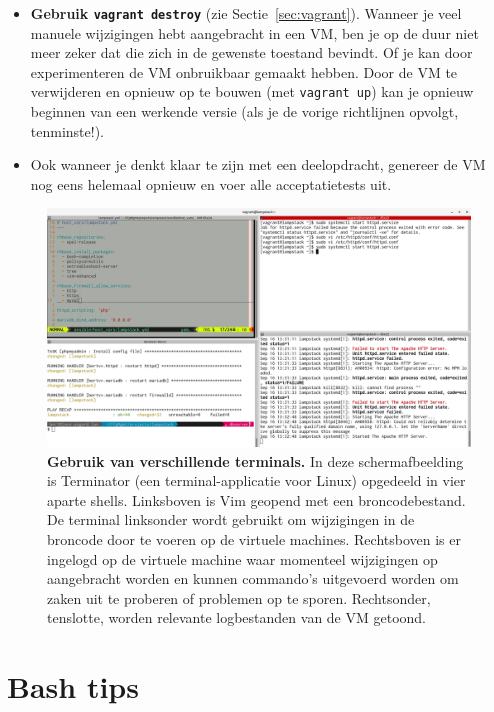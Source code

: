 \begin{itemize}
  \item \textbf{Gebruik \texttt{vagrant destroy}} (zie Sectie~\ref{sec:vagrant}). Wanneer je veel manuele wijzigingen hebt aangebracht in een VM, ben je op de duur niet meer zeker dat die zich in de gewenste toestand bevindt. Of je kan door experimenteren de VM onbruikbaar gemaakt hebben. Door de VM te verwijderen en opnieuw op te bouwen (met \texttt{vagrant up}) kan je opnieuw beginnen van een werkende versie (als je de vorige richtlijnen opvolgt, tenminste!).
  \item Ook wanneer je denkt klaar te zijn met een deelopdracht, genereer de VM nog eens helemaal opnieuw en voer alle acceptatietests uit.
\end{itemize}

\begin{figure}
  \centering
  \includegraphics[width=\linewidth]{img/screenshot-terminals}
  \caption[Gebruik van verschillende terminals.]{\textbf{Gebruik van verschillende terminals.} In deze schermafbeelding is Terminator (een terminal-applicatie voor Linux) opgedeeld in vier aparte shells. Linksboven is Vim geopend met een broncodebestand. De terminal linksonder wordt gebruikt om wijzigingen in de broncode door te voeren op de virtuele machines. Rechtsboven is er ingelogd op de virtuele machine waar momenteel wijzigingen op aangebracht worden en kunnen commando's uitgevoerd worden om zaken uit te proberen of problemen op te sporen. Rechtsonder, tenslotte, worden relevante logbestanden van de VM getoond.}
  \label{fig:screenshot-terminals}
\end{figure}

\section{Bash tips}
\label{sec:bash_tips}


